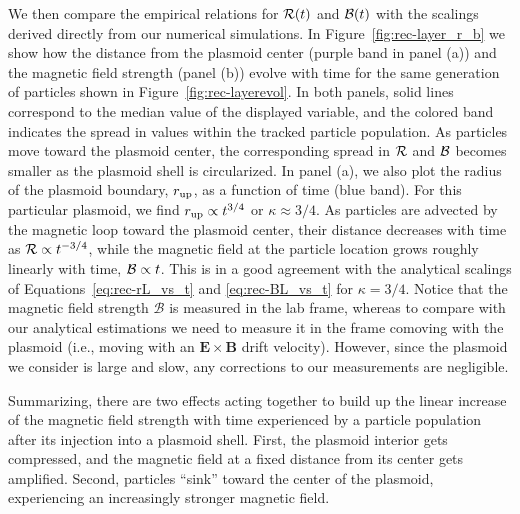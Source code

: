 We then compare the empirical relations for $\mathcal{R}(t)$ and $\mathcal{B}(t)$ with the scalings derived directly from our numerical simulations. In Figure~\ref{fig:rec-layer_r_b} we show how the distance from the plasmoid center (purple band in panel (a)) and the magnetic field strength (panel (b)) evolve with time for the same generation of particles shown in Figure~\ref{fig:rec-layerevol}. In both panels, solid lines correspond to the median value of the displayed variable, and the colored band indicates the spread in values within the tracked particle population. As particles move toward the plasmoid center, the corresponding spread in $\mathcal{R}$ and $\mathcal{B}$ becomes smaller as the plasmoid shell is circularized. In panel (a), we also plot the radius of the plasmoid boundary, $r_{\rm up}$, as a function of time (blue band). For this particular plasmoid, we find $r_{\rm up}\propto t^{3/4}$ or $\kappa\approx 3/4$. As particles are advected by the magnetic loop toward the plasmoid center, their distance decreases with time as $\mathcal{R}\propto t^{-3/4}$, while the magnetic field at the particle location grows roughly linearly with time, $\mathcal{B}\propto t$. This is in a good agreement with the analytical scalings of Equations~\eqref{eq:rec-rL_vs_t} and \eqref{eq:rec-BL_vs_t} for $\kappa=3/4$. Notice that the magnetic field strength $\mathcal{B}$ is measured in the lab frame, whereas to compare with our analytical estimations we need to measure it in the frame comoving with the plasmoid (i.e., moving with an $\boldsymbol{E}\times\boldsymbol{B}$ drift velocity). However, since the plasmoid we consider is large and slow, any corrections to our measurements are negligible.

Summarizing, there are two effects acting together to build up the linear increase of the magnetic field strength with time experienced by a particle population after its injection into a plasmoid shell. First, the plasmoid interior gets compressed, and the magnetic field at a fixed distance from its center gets amplified. Second, particles ``sink'' toward the center of the plasmoid, experiencing an increasingly stronger magnetic field. 

